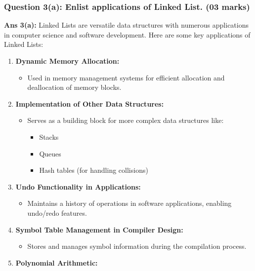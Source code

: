 \hypertarget{question-3a-enlist-applications-of-linked-list.-03-marks}{%
\subsubsection{Question 3(a): Enlist applications of Linked List. (03
marks)}\label{question-3a-enlist-applications-of-linked-list.-03-marks}}

\textbf{Ans 3(a):} Linked Lists are versatile data structures with
numerous applications in computer science and software development. Here
are some key applications of Linked Lists:

\begin{enumerate}
\def\labelenumi{\arabic{enumi}.}
\tightlist
\item
  \textbf{Dynamic Memory Allocation:}

  \begin{itemize}
  \tightlist
  \item
    Used in memory management systems for efficient allocation and
    deallocation of memory blocks.
  \end{itemize}
\item
  \textbf{Implementation of Other Data Structures:}

  \begin{itemize}
  \tightlist
  \item
    Serves as a building block for more complex data structures like:

    \begin{itemize}
    \tightlist
    \item
      Stacks
    \item
      Queues
    \item
      Hash tables (for handling collisions)
    \end{itemize}
  \end{itemize}
\item
  \textbf{Undo Functionality in Applications:}

  \begin{itemize}
  \tightlist
  \item
    Maintains a history of operations in software applications, enabling
    undo/redo features.
  \end{itemize}
\item
  \textbf{Symbol Table Management in Compiler Design:}

  \begin{itemize}
  \tightlist
  \item
    Stores and manages symbol information during the compilation
    process.
  \end{itemize}
\item
  \textbf{Polynomial Arithmetic:}


\end{enumerate}
